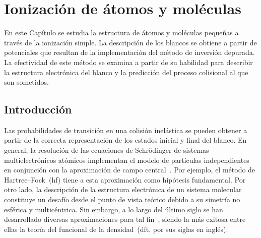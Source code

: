 \chapter{Ionización de átomos y moléculas}
\label{chap:iondim}

En este Capítulo se estudia la estructura de átomos y moléculas pequeñas
a través de la ionización simple. La descripción de los blancos se 
obtiene a partir de potenciales que resultan de la implementación del 
método de inversión depurada. La efectividad de este método se examina a
partir de su habilidad para describir la estructura electrónica del 
blanco y la predicción del proceso colisional al que son sometidos.

\section{Introducción}


Las probabilidades de transición en una colisión inelástica se pueden 
obtener a partir de la correcta representación de los estados inicial y 
final del blanco. En general, la resolución de las ecuaciones de 
Schr\"odinger de sistemas multielectrónicos atómicos implementan el 
modelo de partículas independientes en conjunción con la aproximación 
de campo central~\cite{Bransden:03,Cowan:81}. Por ejemplo, el método de 
Hartree--Fock~(\acs{hf}) tiene a esta aproximación como hipótesis 
fundamental. Por otro lado, la descripción de la estructura electrónica 
de un sistema molecular constituye un desafío desde el punto de vista 
teórico debido a su simetría no esférica y 
multicéntrica. Sin embargo, a lo largo del último siglo se han 
desarrollado diversas aproximaciones para tal 
fin~\cite{Helgaker:00,Schaefer:04}, siendo la más exitosa entre ellas la 
teoría del funcional de la densidad~(\acs{dft}, por sus siglas en 
inglés).

